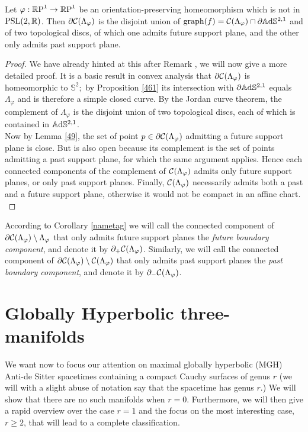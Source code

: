 \begin{corollary}\label{nametag}
    Let $\varphi:\S\to\S$ be an orientation-preserving homeomorphism which is not in $\PSL$. Then $\partial\CF$ is the disjoint union of $\text{graph}(f)=\CF\cap\partial\A^{2,1}$ and of two topological discs, of which one admits future support plane, and the other only admits past support plane. 
\end{corollary}
\begin{proof}
    We have already hinted at this after Remark \cite{436}, we will now give a more detailed proof. It is a basic result in convex analysis that $\partial\CF$ is homeomorphic to $\mathbb{S}^2;$ by Proposition \ref{461} its intersection with $\partial\A^{2,1}$ equals $\Lambda_\varphi$ and is therefore a simple closed curve. By the Jordan curve theorem, the complement of $\Lambda_\varphi$ is the disjoint union of two topological discs, each of which is contained in $\A^{2,1}$. \\
    Now by Lemma \ref{49}, the set of point $p\in\partial\CF$ admitting a future support plane is close. But is also open because its complement is the set of points admitting a past support plane, for which the same argument applies. Hence each connected components of the complement of $\CF$ admits only future support planes, or only past support planes. Finally, $\CF$ necessarily admits both a past and a future support plane, otherwise it would not be compact in an affine chart.    \\
\end{proof}

According to Corollary \ref{nametag} we will call the connected component of $\partial\CF\setminus \Lambda_\varphi$ that only admits future support planes the \textit{future boundary component}, and denote it by $\partial_+\CF$. Similarly, we will call the connected component of $\partial\CF\setminus\CF$ that only admits past support planes the \textit{past boundary component}, and denote it by $\partial_-\CF$.\\

\section{Globally Hyperbolic three-manifolds}
We want now to focus our attention on maximal globally hyperbolic (MGH) Anti-de Sitter spacetimes containing a compact Cauchy surfaces of genus $r$ (we will with a slight abuse of notation say that the spacetime has genus $r$.) We will show that there are no such manifolds when $r=0$. Furthermore, we will then give a rapid overview over the case $r=1$ and the focus on the most interesting case, $r\geq 2$, that will lead to a complete classification.

